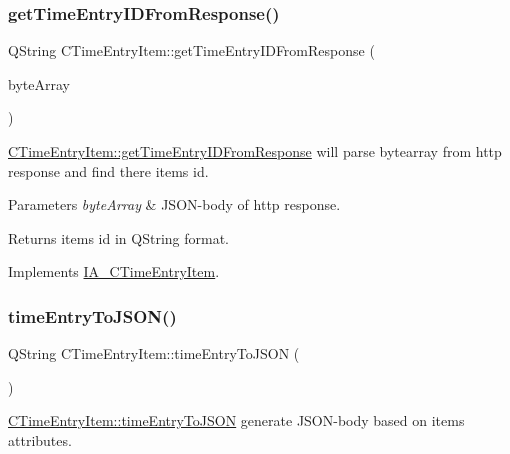 \subsubsection{\texorpdfstring{get\+Time\+Entry\+I\+D\+From\+Response()}{getTimeEntryIDFromResponse()}}
{\footnotesize\ttfamily Q\+String C\+Time\+Entry\+Item\+::get\+Time\+Entry\+I\+D\+From\+Response (\begin{DoxyParamCaption}\item[{Q\+Byte\+Array}]{byte\+Array }\end{DoxyParamCaption})\hspace{0.3cm}{\ttfamily [virtual]}}



\hyperlink{classCTimeEntryItem_a1c2c26c28875293288a254bfea367f71}{C\+Time\+Entry\+Item\+::get\+Time\+Entry\+I\+D\+From\+Response} will parse bytearray from http response and find there item\textquotesingle{}s id. 


\begin{DoxyParams}{Parameters}
{\em byte\+Array} & J\+S\+O\+N-\/body of http response. \\
\hline
\end{DoxyParams}
\begin{DoxyReturn}{Returns}
item\textquotesingle{}s id in Q\+String format. 
\end{DoxyReturn}


Implements \hyperlink{classIA__CTimeEntryItem}{I\+A\+\_\+\+C\+Time\+Entry\+Item}.

\mbox{\label{classCTimeEntryItem_acc7b42acd707bb21357f2ea81cc414a2}} 
\subsubsection{\texorpdfstring{time\+Entry\+To\+J\+S\+O\+N()}{timeEntryToJSON()}}
{\footnotesize\ttfamily Q\+String C\+Time\+Entry\+Item\+::time\+Entry\+To\+J\+S\+ON (\begin{DoxyParamCaption}{ }\end{DoxyParamCaption})\hspace{0.3cm}{\ttfamily [virtual]}}



\hyperlink{classCTimeEntryItem_acc7b42acd707bb21357f2ea81cc414a2}{C\+Time\+Entry\+Item\+::time\+Entry\+To\+J\+S\+ON} generate J\+S\+O\+N-\/body based on item\textquotesingle{}s attributes. 

